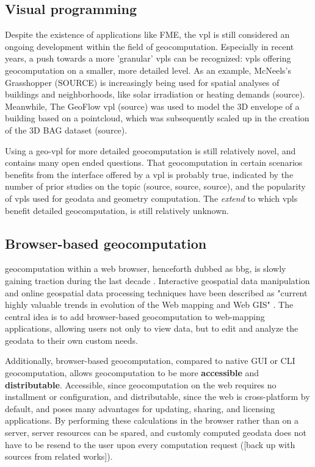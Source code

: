\subsection*{Visual programming}


Despite the existence of applications like FME, the \ac{vpl} is still considered an ongoing development within the field of geocomputation. 
Especially in recent years, a push towards a more 'granular' \ac{vpl}s can be recognized: 
\ac{vpl}s offering geocomputation on a smaller, more detailed level. 
As an example, McNeels's Grasshopper (SOURCE) is increasingly being used for spatial analyses of buildings and neighborhoods, like solar irradiation or heating demands (source). 
Meanwhile, The GeoFlow \ac{vpl} (source) was used to model the 3D envelope of a building based on a pointcloud, which was subsequently scaled up in the creation of the 3D BAG dataset (source).

Using a \ac{geo-vpl} for more detailed geocomputation is still relatively novel, and contains many open ended questions. That geocomputation in certain scenarios benefits from the interface offered by a \ac{vpl} is probably true, indicated by the number of prior studies on the topic (source, source, source), and the popularity of \ac{vpl}s used for geodata and geometry computation. The \emph{extend} to which \ac{vpl}s benefit detailed geocomputation, is still relatively unknown. 

\subsection*{Browser-based geocomputation}

\ac{geocomputation} within a web browser, henceforth dubbed as \ac{bbg}, is slowly gaining traction during the last decade \cite{kulawiak_analysis_2019, panidi_hybrid_2015, hamilton_client-side_2014}. 
Interactive geospatial data manipulation and online geospatial data processing techniques have been described as "current highly valuable trends in evolution of the Web mapping and Web GIS" \cite{panidi_hybrid_2015}. 
The central idea is to add browser-based geocomputation to web-mapping applications, allowing users not only to view data, but to edit and analyze the geodata to their own custom needs.

Additionally, browser-based geocomputation, compared to native GUI or CLI geocomputation, allows geocomputation to be more \textbf{accessible} and \textbf{distributable}. 
Accessible, since geocomputation on the web requires no installment or configuration, 
and distributable, since the web is cross-platform by default, and poses many advantages for updating, sharing, and licensing applications. 
By performing these calculations in the browser rather than on a server, server resources can be spared, and customly computed geodata does not have to be resend to the user upon every computation request ([back up with sources from related works]).

